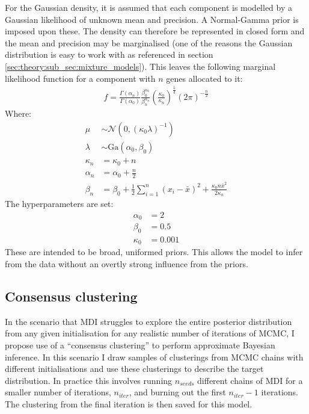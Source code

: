 \documentclass[12pt]{article} %
\begin{document}
	For the Gaussian density, it is assumed that each component is modelled by a Gaussian likelihood of unknown mean and  precision. A Normal-Gamma  prior is imposed upon these. The  density can therefore be represented in closed form and the mean and precision may be marginalised (one of the reasons the Gaussian distribution is easy to work with as referenced in section \ref{sec:theory:sub_sec:mixture_models}). This leaves the following marginal likelihood function for a component with $n$ genes allocated to it:
	\begin{align}
	f = \frac{\Gamma(\alpha_n)}{\Gamma(\alpha_0)} \frac{\beta_0 ^ {\alpha_0}}{\beta_n ^ {\alpha_n}} \left(\frac{\kappa_0}{\kappa_n}\right)^{\frac{1}{2}}\left(2\pi\right)^{-\frac{n}{2}}
	\end{align}
	Where:
	\begin{align}
		\mu &\sim \mathcal{N}(0, (\kappa_0 \lambda)^{-1}) \\
		\lambda &\sim \text{Ga}(\alpha_0, \beta_0) \\
		\kappa_n &= \kappa_0 + n \\
		\alpha_n &= \alpha_0 + \frac{n}{2} \\
		\beta_n &= \beta_0 + \frac{1}{2} \sum_{i=1}^n(x_i - \bar{x})^2 + \frac{\kappa_0 n \bar{x}^2}{2 \kappa_n}
	\end{align}
	The hyperparameters are set:
	\begin{align}
	\alpha_0 &=2 \\
	\beta_0 &= 0.5 \\
	\kappa_0 &= 0.001
	\end{align}
	These are intended to be broad, uniformed priors. This allows the model to infer from the data without an overtly strong influence from the priors.
		
	\subsection{Consensus clustering} \label{sec:consensus_clustering}
	In the scenario that MDI struggles to explore the entire posterior distribution from any given initialisation for any realistic number of iterations of MCMC, I propose use of a ``consensus clustering'' \citep{MontiConsensusClusteringResamplingBased} to perform approximate Bayesian inference. In this scenario I draw samples of clusterings from MCMC chains with different initialisations and use these clusterings to describe the target distribution. In practice this involves running $n_{seeds}$ different chains of MDI for a smaller number of iterations, $n_{iter}$, and burning out the first $n_{iter} - 1$ iterations. The clustering from the final iteration is then saved for this model.
	
\end{document}
